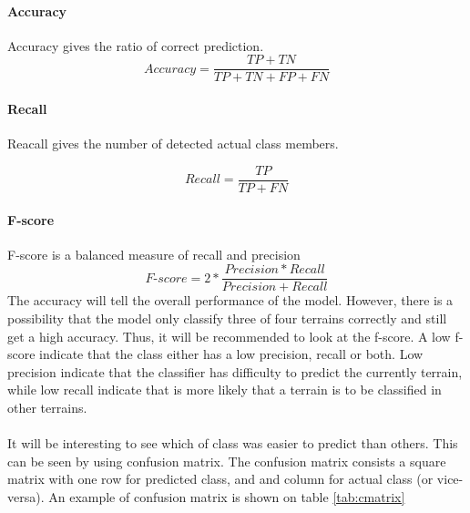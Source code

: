 \documentclass[USenglish]{ifimaster}  %
\begin{document}
	\paragraph{Accuracy}
	Accuracy gives the ratio of correct prediction. 
	\begin{equation}
	Accuracy = \frac{TP + TN}{TP + TN + FP + FN}
	\label{eq:acc}
	\end{equation}
	
	\paragraph{Recall}
	Reacall gives the number of detected actual class members.
	
	\begin{equation}
	Recall = \frac{TP}{TP + FN}
	\label{eq:recall}
	\end{equation}
	
	\paragraph{F-score}
	F-score is a balanced measure of recall and precision 
	\begin{equation}
	\textit{F-score} = 2*\frac{Precision*Recall}{Precision + Recall}
	\label{eq:fscore}
	\end{equation}
	\FloatBarrier
The accuracy will tell the overall performance of the model. However, there is a possibility that the model only classify three of four terrains correctly and still get a high accuracy. Thus, it will be recommended to look at the f-score. A low f-score indicate that the class either has a low precision, recall or both. Low precision indicate that the classifier has difficulty to predict the currently terrain, while low recall indicate that is more likely that a terrain is to be classified in other terrains.
\\
\\
It will be interesting to see which of class was easier to predict than others. This can be seen by using confusion matrix. The confusion matrix consists a square matrix with one row for predicted class, and and column for actual class (or vice-versa).
An example of confusion matrix is shown on table \ref{tab:cmatrix}
	
\end{document}
